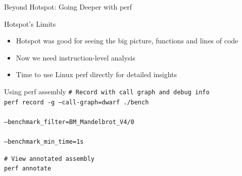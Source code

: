 \documentclass{beamer}
\begin{document}
\begin{frame}{Beyond Hotspot: Going Deeper with perf}
    \begin{block}{Hotspot's Limits}
        \begin{itemize}
            \item Hotspot was good for seeing the big picture, functions and lines of code
            \item Now we need instruction-level analysis
            \item Time to use Linux perf directly for detailed insights
        \end{itemize}
    \end{block}
    \begin{exampleblock}{Using perf assembly}
        \texttt{\# Record with call graph and debug info}\\
        \texttt{perf record -g --call-graph=dwarf ./bench \\}\\
        \texttt{\hspace{2em}--benchmark\_filter=BM\_Mandelbrot\_V4/0 \\}\\
        \texttt{\hspace{2em}--benchmark\_min\_time=1s}
        
        \texttt{\# View annotated assembly}\\
        \texttt{perf annotate}
    \end{exampleblock}
\end{frame}
\end{document}
